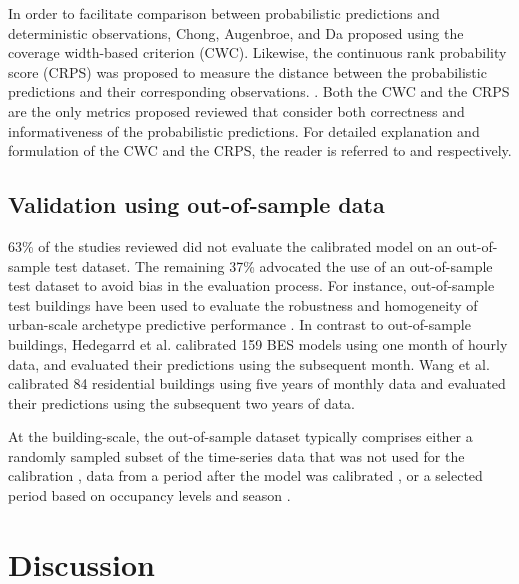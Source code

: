 \documentclass[review]{elsarticle}
\begin{document}
In order to facilitate comparison between probabilistic predictions and deterministic observations, Chong, Augenbroe, and Da \cite{chong2021occupancy} proposed using the coverage width-based criterion (CWC). Likewise, the continuous rank probability score (CRPS) was proposed to measure the distance between the probabilistic predictions and their corresponding observations. \cite{li2016assessment}. Both the CWC and the CRPS are the only metrics proposed reviewed that consider both correctness and informativeness of the probabilistic predictions. For detailed explanation and formulation of the CWC and the CRPS, the reader is referred to \cite{chong2021occupancy} and \cite{gneiting2007strictly} respectively. 

\subsection{Validation using out-of-sample data}

63\% of the studies reviewed did not evaluate the calibrated model on an out-of-sample test dataset. The remaining 37\% advocated the use of an out-of-sample test dataset to avoid bias in the evaluation process. For instance, out-of-sample test buildings have been used to evaluate the robustness and homogeneity of urban-scale archetype predictive performance \cite{kristensen2018hierarchical, sokol2017validation, kristensen2020long}. In contrast to out-of-sample buildings, Hedegarrd et al. \cite{hedegaard2019bottom} calibrated 159 BES models using one month of hourly data, and evaluated their predictions using the subsequent month. Wang et al. \cite{wang2020bayesian} calibrated 84 residential buildings using five years of monthly data and evaluated their predictions using the subsequent two years of data.

At the building-scale, the out-of-sample dataset typically comprises either a randomly sampled subset of the time-series data that was not used for the calibration \cite{chong2017bayesian, chong2018guidelines}, data from a period after the model was calibrated \cite{yuan2017simultaneous, yin2016linking, li2016assessment, chen2019meta, manfren2020parametric, yang2015model}, or a selected period based on occupancy levels and season \cite{odonovan2019predicting}. 



\section{Discussion} \label{sec:discussion}
\end{document}
